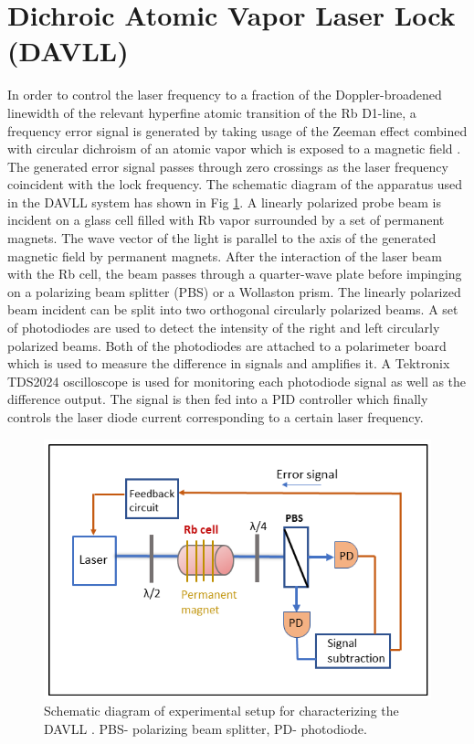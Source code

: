 \section{Dichroic Atomic Vapor Laser Lock (DAVLL)}

In order to control the laser frequency to a fraction of the Doppler-broadened linewidth of the relevant hyperfine atomic transition of the Rb D1-line, a frequency error signal is generated by taking usage of the Zeeman effect combined with circular dichroism of an atomic vapor which is exposed to a magnetic field \cite{doi:10.1063/1.3568824}. The generated error signal passes through zero crossings as the laser frequency coincident with the lock frequency. The schematic diagram of the apparatus used in  the DAVLL system has shown in Fig \ref{fig:DAVLL}. A linearly polarized probe beam is incident on a glass cell filled with Rb vapor surrounded by a set of permanent magnets. The wave vector of the light is parallel to the axis of the generated magnetic field by permanent magnets. After the interaction of the laser beam with the Rb cell, the beam passes through a quarter-wave plate before impinging on a polarizing beam splitter (PBS) or a Wollaston prism. The linearly polarized beam incident can be split into two orthogonal circularly polarized beams. A set of photodiodes are used to detect the intensity of the right and left circularly polarized beams. Both of the photodiodes are attached to a polarimeter board which is used to measure the difference in signals and amplifies it. A Tektronix TDS2024 oscilloscope is used for monitoring each photodiode signal as well as the difference output. The signal is then fed into a PID controller which finally controls the laser diode current corresponding to a certain laser frequency.
\begin{figure}[h]
\centering
\includegraphics[width=0.8\linewidth]{figures/DAVLL}
\caption{Schematic diagram of experimental setup for characterizing the DAVLL . PBS- polarizing beam splitter, PD- photodiode.\label{fig:DAVLL}}
\end{figure}
